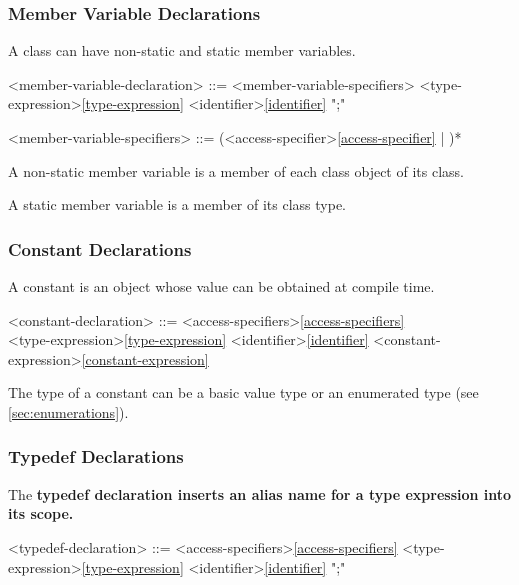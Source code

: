 \documentclass[a4paper,oneside,11pt]{article}
\begin{document}
\subsubsection{Member Variable Declarations}

A class can have non-static and static member variables.

\begin{grammar}
\label{member-variable-declaration}<member-variable-declaration> ::= <member-variable-specifiers> <type-expression>\ref{type-expression} <identifier>\ref{identifier} ";"

<member-variable-specifiers> ::= (<access-specifier>\ref{access-specifier} | )*
\end{grammar}

A non-static member variable is a member of each class object of its class.

A static member variable is a member of its class type.

\subsubsection{Constant Declarations}

A constant is an object whose value can be obtained at compile time.

\begin{grammar}
\label{constant-declaration}<constant-declaration> ::= <access-specifiers>\ref{access-specifiers}\\
 <type-expression>\ref{type-expression} <identifier>\ref{identifier} \lit*{=} <constant-expression>\ref{constant-expression} \lit*{;}

\end{grammar}

The type of a constant can be a basic value type or an enumerated type (see \ref{sec:enumerations}).

\subsubsection{Typedef Declarations}

The \bf{typedef} declaration inserts an alias name for a type expression into its scope.

\begin{grammar}
\label{typedef-declaration}<typedef-declaration> ::= <access-specifiers>\ref{access-specifiers}  <type-expression>\ref{type-expression} <identifier>\ref{identifier} ";"
\end{grammar}
\end{document}
